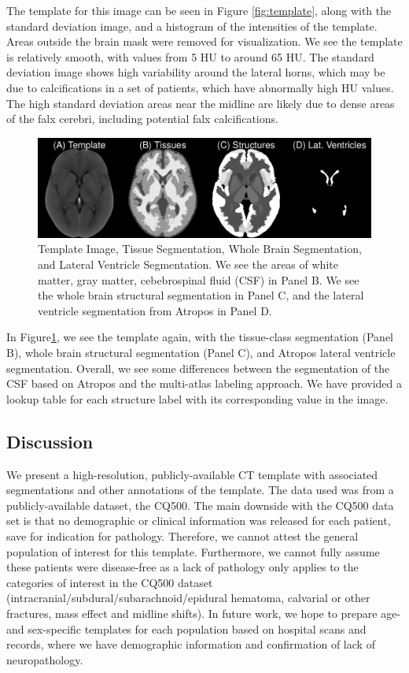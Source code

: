 \documentclass[]{elsarticle} %
\makeatletter
\def\maxwidth{\ifdim\Gin@nat@width>\linewidth\linewidth
\else\Gin@nat@width\fi}
\let\Oldincludegraphics\includegraphics
\renewcommand{\includegraphics}[1]{\Oldincludegraphics[width=\maxwidth]{#1}}
\makeatother
\begin{document}
The template for this image can be seen in Figure \ref{fig:template}, along with the standard deviation image, and a histogram of the intensities of the template. Areas outside the brain mask were removed for visualization. We see the template is relatively smooth, with values from 5 HU to around 65 HU. The standard deviation image shows high variability around the lateral horns, which may be due to calcifications in a set of patients, which have abnormally high HU values. The high standard deviation areas near the midline are likely due to dense areas of the falx cerebri, including potential falx calcifications.

\begin{figure}
\centering
\includegraphics{index_files/figure-latex/all_segs.pdf}
\caption{\label{fig:seg}Template Image, Tissue Segmentation, Whole Brain Segmentation, and Lateral Ventricle Segmentation. We see the areas of white matter, gray matter, cebebrospinal fluid (CSF) in Panel B. We see the whole brain structural segmentation in Panel C, and the lateral ventricle segmentation from Atropos in Panel D.}
\end{figure}

In Figure\ref{fig:seg}, we see the template again, with the tissue-class segmentation (Panel B), whole brain structural segmentation (Panel C), and Atropos lateral ventricle segmentation. Overall, we see some differences between the segmentation of the CSF based on Atropos and the multi-atlas labeling approach. We have provided a lookup table for each structure label with its corresponding value in the image.

\hypertarget{discussion}{%
\subsection{Discussion}\label{discussion}}

We present a high-resolution, publicly-available CT template with associated segmentations and other annotations of the template. The data used was from a publicly-available dataset, the CQ500. The main downside with the CQ500 data set is that no demographic or clinical information was released for each patient, save for indication for pathology. Therefore, we cannot attest the general population of interest for this template. Furthermore, we cannot fully assume these patients were disease-free as a lack of pathology only applies to the categories of interest in the CQ500 dataset (intracranial/subdural/subarachnoid/epidural hematoma, calvarial or other fractures, mass effect and midline shifts). In future work, we hope to prepare age- and sex-specific templates for each population based on hospital scans and records, where we have demographic information and confirmation of lack of neuropathology.
\end{document}
